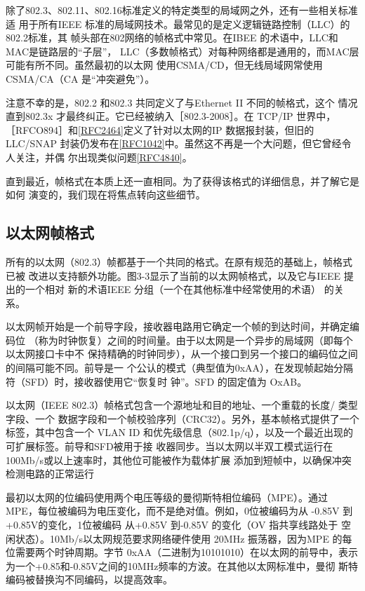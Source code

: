 除了802.3、802.11、802.16标准定义的特定类型的局域网之外，还有一些相关标准适
用于所有IEEE 标准的局域网技术。最常见的是定义逻辑链路控制（LLC）的802.2标准，其
帧头部在802网络的帧格式中常见。在IBEE 的术语中，LLC和MAC是链路层的“子层”，
LLC（多数帧格式）对每种网络都是通用的，而MAC层可能有所不同。虽然最初的以太网
使用CSMA/CD，但无线局域网常使用CSMA/CA（CA 是“冲突避免”）。

\begin{tcolorbox}
    注意不幸的是，802.2 和802.3 共同定义了与Ethernet II 不同的帧格式，这个
    情况直到802.3x 才最终纠正。它已经被纳入［802.3-2008］。在 TCP/IP 世界中，
    ［RFCO894］和\href{https://www.rfc-editor.org/rfc/rfc2464}{[RFC2464]}定义了针对以太网的IP 数据报封装，但旧的LLC/SNAP
    封装仍发布在\href{https://www.rfc-editor.org/rfc/rfc1042}{[RFC1042]}中。虽然这不再是一个大问题，但它曾经令人关注，并偶
    尔出现类似问题\href{https://www.rfc-editor.org/rfc/rfc4840}{[RFC4840]}。
\end{tcolorbox}

直到最近，帧格式在本质上还一直相同。为了获得该格式的详细信息，并了解它是如何
演变的，我们现在将焦点转向这些细节。

\subsection{以太网帧格式}

所有的以太网（802.3）帧都基于一个共同的格式。在原有规范的基础上，帧格式已被
改进以支持额外功能。图3-3显示了当前的以太网帧格式，以及它与IEEE 提出的一个相对
新的术语IEEE 分组（一个在其他标准中经常使用的术语） 的关系。

以太网帧开始是一个前导字段，接收器电路用它确定一个帧的到达时间，并确定编码位
（称为时钟恢复）之间的时间量。由于以太网是一个异步的局域网（即每个以太网接口卡中不
保持精确的时钟同步），从一个接口到另一个接口的编码位之间的间隔可能不同。前导是一
个公认的模式（典型值为0xAA），在发现帧起始分隔符（SFD）时，接收器使用它“恢复时
钟”。SFD 的固定值为 OxAB。


以太网（IEEE 802.3）帧格式包含一个源地址和目的地址、一个重载的长度/ 类型字段、一个
数据字段和一个帧校验序列（CRC32）。另外，基本帧格式提供了一个标签，其中包含一个
VLAN ID 和优先级信息（802.1p/q），以及一个最近出现的可扩展标签。前导和SFD被用于接
收器同步。当以太网以半双工模式运行在100Mb/s或以上速率时，其他位可能被作为载体扩展
添加到短帧中，以确保冲突检测电路的正常运行

\begin{tcolorbox}
    最初以太网的位编码使用两个电压等级的曼彻斯特相位编码（MPE）。通过
    MPE，每位被编码为电压变化，而不是绝对值。例如，0位被编码为从 -0.85V 到
    +0.85V的变化，1位被编码 从+0.85V 到-0.85V 的变化（OV 指共享线路处于
    空闲状态）。10Mb/s以太网规范要求网络硬件使用 20MHz 振荡器，因为MPE 的每
    位需要两个时钟周期。字节 0xAA（二进制为10101010）在以太网的前导中，表示
    为一个+0.85和-0.85V之间的10MHz频率的方波。在其他以太网标准中，曼彻
    斯特编码被替换沟不同编码，以提高效率。
\end{tcolorbox}

